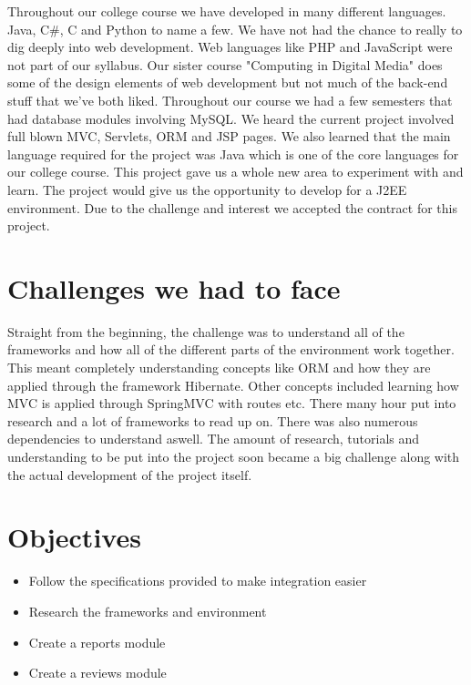 Throughout our college course we have developed in many different languages. Java, C\#, C and Python to name a few. We have not had the chance to really to dig deeply into web development. Web languages like PHP and JavaScript were not part of our syllabus. Our sister course "Computing in Digital Media" does some of the design elements of web development but not much of the back-end stuff that we've both liked. Throughout our course we had a few semesters that had database modules involving MySQL. We heard the current project involved full blown MVC, Servlets, ORM and JSP pages. We also learned that the main language required for the project was Java which is one of the core languages for our college course. This project gave us a whole new area to experiment with and learn. The project would give us the opportunity to develop for a J2EE environment. Due to the challenge and interest we accepted the contract for this project.

\section{Challenges we had to face}    

Straight from the beginning, the challenge was to understand all of the frameworks and how all of the different parts of the environment work together. This meant completely understanding concepts like ORM and how they are applied through the framework Hibernate. Other concepts included learning how MVC is applied through SpringMVC with routes etc. There many hour put into research and a lot of frameworks to read up on. There was also numerous dependencies to understand aswell. The amount of research, tutorials and understanding to be put into the project soon became a big challenge along with the actual development of the project itself. 


\section{Objectives}

\begin{itemize}
\item{Follow the specifications provided to make integration easier}
\item{Research the frameworks and environment}
\item{Create a reports module}
\item{Create a reviews module}
\end{itemize}

